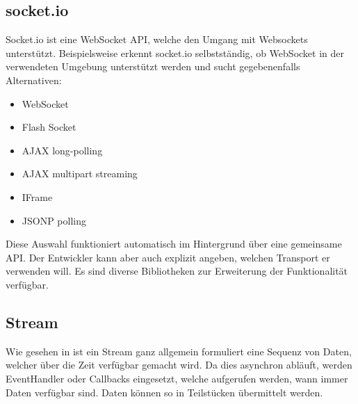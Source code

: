 

\subsection{socket.io}


Socket.io ist eine WebSocket API, welche den Umgang mit Websockets unterstützt. Beispielsweise erkennt socket.io selbstständig, ob Web\-So\-cket in der verwendeten Umgebung unterstützt werden und sucht gegebenenfalls Alternativen:

\begin{itemize}
    \item WebSocket
    \item Flash Socket
    \item AJAX long-polling
    \item AJAX multipart streaming
    \item IFrame
    \item JSONP polling
\end{itemize}

Diese Auswahl funktioniert automatisch im Hintergrund über eine gemeinsame API. Der Entwickler kann aber auch explizit angeben, welchen Transport er verwenden  will. Es sind diverse Bibliotheken zur Erweiterung der Funktionalität verfügbar.\\\cite{WebSocke14:online, prusty2016modern, rai2013socket}



\subsection{Stream}

Wie gesehen in \cite[S.~56]{prusty2016modern} ist ein Stream ganz allgemein formuliert eine Sequenz von Daten, welcher über die Zeit verfügbar gemacht wird. Da dies asynchron abläuft, werden EventHandler oder Callbacks eingesetzt, welche aufgerufen werden, wann immer Daten verfügbar sind. Daten können so in Teilstücken übermittelt werden.



